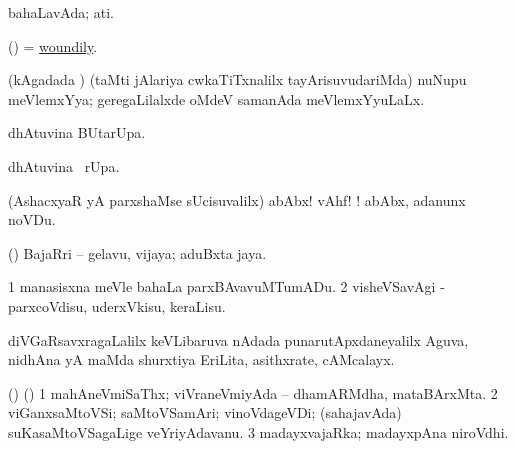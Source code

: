 \begin{center}
\bentry
{} 
\gl{\gu}
\expl{}
\bmng
bahaLavAda; ati. 
\emng
\eentry

\bentry
{} 
\gl{\kirxvi}
\expl{}
\bmng
(\pArxparx) = \hyperlink{woundily}{woundily}. 
\emng
\eentry

\bentry
{} 
\gl{\gu}
\expl{}
\bmng
(kAgadada \vi) (taMti jAlariya cwkaTiTxnalilx tayArisuvudariMda) nuNupu meVlemxYya; geregaLilalxde oMdeV samanAda meVlemxYyuLaLx. 
\emng
\eentry

\bentry
{} 
\gl{\kirx}
\expl{}
\bmng
{} dhAtuvina BUtarUpa. 
\emng
\eentry

\bentry
{} 
\gl{\kirx}
\expl{}
\bmng
{} dhAtuvina \BUkaq\ rUpa. 
\emng
\eentry

\bentry
{} 
\gl{\BAavayx}
\expl{}
\bmng
(AshacxyaR yA parxshaMse sUcisuvalilx) abAbx! vAhf! !  abAbx, adanunx noVDu. 
\emng
\eentry

\bentry
{} 
\gl{\nA}
\expl{}
\bmng
(\ashi) BajaRri -- gelavu, vijaya; aduBxta jaya. 
\emng
\eentry

\bentry
{} 
\gl{\sakirx}
\expl{}
\bmng
\bnum
\num{1} manasisxna meVle bahaLa parxBAvavuMTumADu. 
\num{2} visheVSavAgi -parxcoVdisu, uderxVkisu, keraLisu. 
\enum
\emng
\eentry

\bentry
{} 
\gl{\nA}
\expl{}
\bmng
diVGaRsavxragaLalilx keVLibaruva nAdada punarutApxdaneyalilx Aguva, nidhAna yA maMda shurxtiya EriLita, asithxrate, cAMcalayx. 
\emng
\eentry

\bentry
{} 
\gl{\nA}
\expl{}
\bmng
(\AseTxrXV) (\ashi) 
\bnum
\num{1} mahAneVmiSaThx; viVraneVmiyAda -- dhamARMdha, mataBArxMta. 
\num{2} viGanxsaMtoVSi; saMtoVSamAri; vinoVdageVDi; (sahajavAda) suKasaMtoVSagaLige veYriyAdavanu. 
\num{3} madayxvajaRka; madayxpAna niroVdhi. 
\enum
\emng
\eentry

\bentry
{} 
\gl{\saMkiSx}
\expl{}
\bmng
{}  
\emng
\eentry

\bentry
{} 
\gl{\saMkiSx}
\expl{}
\bmng
{} 
\emng
\eentry

\bentry
{} 
\gl{\saMkiSx}
\expl{}
\bmng
{} 
\emng
\eentry


\end{center}

